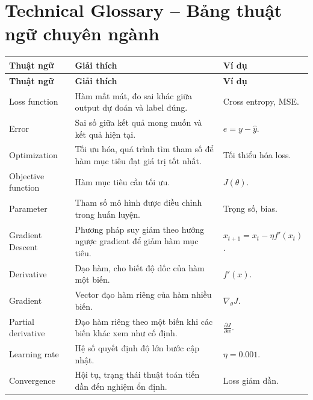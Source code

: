 \section{Technical Glossary -- Bảng thuật ngữ chuyên ngành}

\small
\begin{longtable}{p{}p{}p{}}
\toprule
\textbf{Thuật ngữ} & \textbf{Giải thích} & \textbf{Ví dụ} \\
\midrule
\endfirsthead

\toprule
\textbf{Thuật ngữ} & \textbf{Giải thích} & \textbf{Ví dụ} \\
\midrule
\endhead

Loss function & Hàm mất mát, đo sai khác giữa output dự đoán và label đúng. & Cross entropy, MSE. \\

Error & Sai số giữa kết quả mong muốn và kết quả hiện tại. & $e=y-\hat{y}$. \\

Optimization & Tối ưu hóa, quá trình tìm tham số để hàm mục tiêu đạt giá trị tốt nhất. & Tối thiểu hóa loss. \\

Objective function & Hàm mục tiêu cần tối ưu. & $J(\theta)$. \\

Parameter & Tham số mô hình được điều chỉnh trong huấn luyện. & Trọng số, bias. \\

Gradient Descent & Phương pháp suy giảm theo hướng ngược gradient để giảm hàm mục tiêu. & $x_{t+1}=x_t-\eta f'(x_t)$. \\

Derivative & Đạo hàm, cho biết độ dốc của hàm một biến. & $f'(x)$. \\

Gradient & Vector đạo hàm riêng của hàm nhiều biến. & $\nabla_\theta J$. \\

Partial derivative & Đạo hàm riêng theo một biến khi các biến khác xem như cố định. & $\frac{\partial J}{\partial w}$. \\

Learning rate & Hệ số quyết định độ lớn bước cập nhật. & $\eta=0.001$. \\

Convergence & Hội tụ, trạng thái thuật toán tiến dần đến nghiệm ổn định. & Loss giảm dần. \\


\end{longtable}
